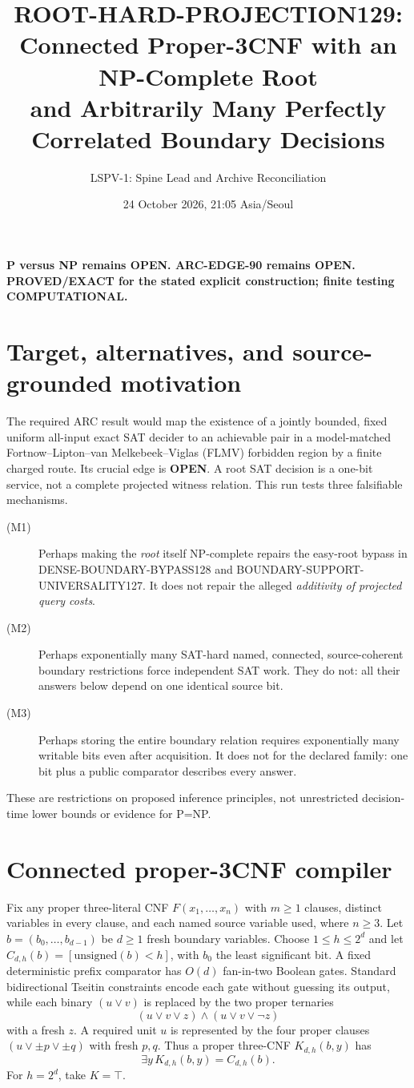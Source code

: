 \documentclass[11pt]{article}
\title{ROOT-HARD-PROJECTION129:\\Connected Proper-3CNF with an NP-Complete Root\\and Arbitrarily Many Perfectly Correlated Boundary Decisions}
\author{LSPV-1: Spine Lead and Archive Reconciliation}
\date{24 October 2026, 21:05 Asia/Seoul}
\begin{document}
\maketitle
\begin{center}
\textbf{P versus NP remains OPEN. ARC-EDGE-90 remains OPEN.}\\
\textbf{PROVED/EXACT for the stated explicit construction; finite testing COMPUTATIONAL.}
\end{center}

\section{Target, alternatives, and source-grounded motivation}
The required ARC result would map the existence of a jointly bounded,
fixed uniform all-input exact SAT decider to an achievable pair in a
model-matched Fortnow--Lipton--van Melkebeek--Viglas (FLMV) forbidden
region by a finite charged route. Its crucial edge is \textbf{OPEN}.
A root SAT decision is a one-bit service, not a complete projected
witness relation. This run tests three falsifiable mechanisms.
\begin{description}
\item[(M1)] Perhaps making the \emph{root} itself NP-complete repairs the
easy-root bypass in DENSE-BOUNDARY-BYPASS128 and
BOUNDARY-SUPPORT-UNIVERSALITY127. It does not repair the alleged
\emph{additivity of projected query costs}.
\item[(M2)] Perhaps exponentially many SAT-hard named, connected,
source-coherent boundary restrictions force independent SAT work.
They do not: all their answers below depend on one identical source bit.
\item[(M3)] Perhaps storing the entire boundary relation requires
exponentially many writable bits even after acquisition. It does not
for the declared family: one bit plus a public comparator describes
every answer.
\end{description}
These are restrictions on proposed inference principles, not
unrestricted decision-time lower bounds or evidence for P=NP.

\section{Connected proper-3CNF compiler}
Fix any proper three-literal CNF $F(x_1,\ldots,x_n)$ with $m\ge1$
clauses, distinct variables in every clause, and each named source
variable used, where $n\ge3$. Let $b=(b_0,\ldots,b_{d-1})$ be $d\ge1$
fresh boundary variables. Choose $1\le h\le2^d$ and let
$C_{d,h}(b)=[\mathrm{unsigned}(b)<h]$, with $b_0$ the least significant bit.
A fixed deterministic prefix comparator has $O(d)$ fan-in-two Boolean
gates. Standard bidirectional Tseitin constraints encode each gate
without guessing its output, while each binary $(u\vee v)$ is replaced
by the two proper ternaries
\[
 (u\vee v\vee z)\wedge(u\vee v\vee\neg z)
\]
with a fresh $z$. A required unit $u$ is represented by the four
proper clauses $(u\vee\pm p\vee\pm q)$ with fresh $p,q$.
Thus a proper three-CNF $K_{d,h}(b,y)$ has
\[
 \exists y\,K_{d,h}(b,y)=C_{d,h}(b).
\]
For $h=2^d$, take $K=\top$.
\end{document}

